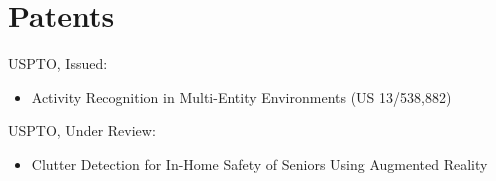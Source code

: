 \AOCLine
\section*{Patents}
\label{sec:patents}

USPTO, Issued:

\begin{itemize}
  \item{Activity Recognition in Multi-Entity Environments (US 13/538,882)}
\end{itemize}

USPTO, Under Review:
\begin{itemize}
  \item{Clutter Detection for In-Home Safety of Seniors Using Augmented Reality}
\end{itemize}


